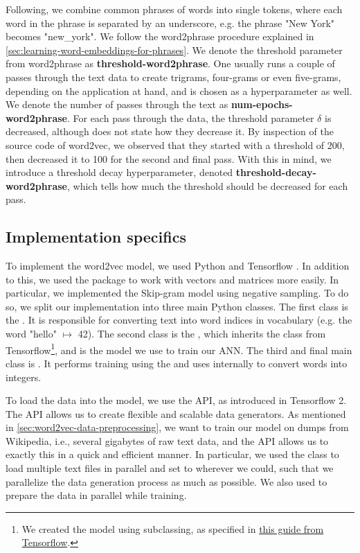 Following, we combine common phrases of words into single tokens, where each word in the phrase is separated by an underscore, e.g. the phrase "New York" becomes "new\_york". We follow the word2phrase procedure explained in \cref{sec:learning-word-embeddings-for-phrases}. We denote the threshold parameter from word2phrase as \textbf{threshold-word2phrase}. One usually runs a couple of passes through the text data to create trigrams, four-grams or even five-grams, depending on the application at hand, and is chosen as a hyperparameter as well. We denote the number of passes through the text as \textbf{num-epochs-word2phrase}. For each pass through the data, the threshold parameter $\delta$ is decreased, although \cite{mikolov2013b} does not state how they decrease it. By inspection of the source code of word2vec, we observed that they started with a threshold of 200, then decreased it to 100 for the second and final pass. With this in mind, we introduce a threshold decay hyperparameter, denoted \textbf{threshold-decay-word2phrase}, which tells how much the threshold should be decreased for each pass.

\subsection{Implementation specifics}
To implement the word2vec model, we used Python and Tensorflow \cite{tensorflow2015-whitepaper}. In addition to this, we used the  \cite{2020NumPy-Array} package to work with vectors and matrices more easily. In particular, we implemented the Skip-gram model using negative sampling. To do so, we split our implementation into three main Python classes. The first class is the . It is responsible for converting text into word indices in vocabulary (e.g. the word "hello" $\mapsto$ 42). The second class is the , which inherits the  class from Tensorflow\footnote{We created the model using subclassing, as specified in \href{https://www.tensorflow.org/guide/keras/custom_layers_and_models}{this guide from Tensorflow}.}, and is the model we use to train our ANN. The third and final main class is . It performs training using the  and uses  internally to convert words into integers.

To load the data into the model, we use the  API, as introduced in Tensorflow 2. The  API allows us to create flexible and scalable data generators. As mentioned in \cref{sec:word2vec-data-preprocessing}, we want to train our model on dumps from Wikipedia, i.e., several gigabytes of raw text data, and the  API allows us to exactly this in a quick and efficient manner. In particular, we used the  class to load multiple text files in parallel and set  to  wherever we could, such that we parallelize the data generation process as much as possible. We also used  to prepare the data in parallel while training.

